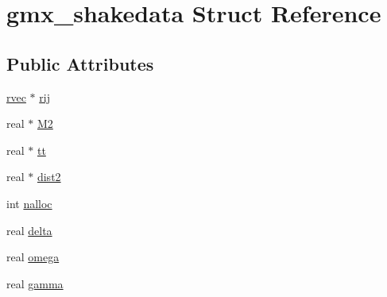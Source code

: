 \hypertarget{structgmx__shakedata}{\section{gmx\-\_\-shakedata \-Struct \-Reference}
\label{structgmx__shakedata}
}
\subsection*{\-Public \-Attributes}
\begin{DoxyCompactItemize}
\item 
\hyperlink{share_2template_2gromacs_2types_2simple_8h_aa02a552a4abd2f180c282a083dc3a999}{rvec} $\ast$ \hyperlink{structgmx__shakedata_a6253656af9ec145464c89c0da4f411cc}{rij}
\item 
real $\ast$ \hyperlink{structgmx__shakedata_a32dc43b8fe8c5571f91243fdb147f070}{\-M2}
\item 
real $\ast$ \hyperlink{structgmx__shakedata_a666a546766fa59269ebbdde5987780f1}{tt}
\item 
real $\ast$ \hyperlink{structgmx__shakedata_af280281af2429eee02f6b2d4da42820f}{dist2}
\item 
int \hyperlink{structgmx__shakedata_a3c28db380c26db39b4350df68eb3e513}{nalloc}
\item 
real \hyperlink{structgmx__shakedata_a46b0acd31a830f5352e46c67f62aff27}{delta}
\item 
real \hyperlink{structgmx__shakedata_a2142ed7ecfd17f65fff57e6b49068934}{omega}
\item 
real \hyperlink{structgmx__shakedata_afd9c7cb21efc0468d35b3973b426662e}{gamma}
\end{DoxyCompactItemize}


